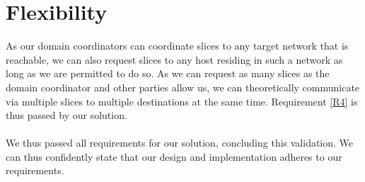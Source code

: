 \section{Flexibility}
As our domain coordinators can coordinate slices to any target network that is reachable, we can also request slices to any host residing in such a network as long as we are permitted to do so. As we can request as many slices as the domain coordinator and other parties allow us, we can theoretically communicate via multiple slices to multiple destinations at the same time. Requirement \ref{R4} is thus passed by our solution.

\paragraph{} We thus passed all requirements for our solution, concluding this validation. We can thus confidently state that our design and implementation adheres to our requirements.
